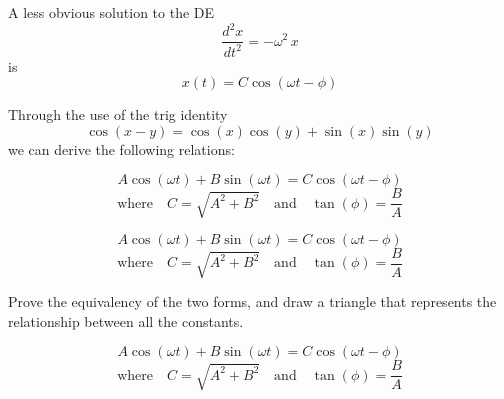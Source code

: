 \documentclass[12pt]{amsart}
\begin{document}
\newpage
A less obvious solution to the DE
$$\frac{d^2x}{dt^2}= - \omega^2\, x $$
is 
$$x(t)= C\cos(\omega t - \phi)$$

Through the use of the trig identity 
$$\cos(x-y) = \cos(x)\cos(y) + \sin(x)\sin(y)$$ 
we can derive the following relations:

\begin{boxnote}
$$A \cos(\omega t) + B \sin(\omega t) = C \cos(\omega t - \phi) $$
$$\text{where} \quad C = \sqrt{A^2 + B^2} \quad \text{and} \quad \tan(\phi) = \frac{B}{A}$$
\end{boxnote}

\newpage
$$A \cos(\omega t) + B \sin(\omega t) = C \cos(\omega t - \phi) $$
$$\text{where} \quad C = \sqrt{A^2 + B^2} \quad \text{and} \quad \tan(\phi) = \frac{B}{A}$$

\begin{problem}
 Prove the equivalency of the two forms, and draw a
  triangle that represents the relationship between all the
  constants.
\end{problem}

\newpage
\hfill
\begin{minipage}{0.7\linewidth}
$$A \cos(\omega t) + B \sin(\omega t) = C \cos(\omega t - \phi) $$
$$\text{where} \quad C = \sqrt{A^2 + B^2} \quad \text{and} \quad \tan(\phi) = \frac{B}{A}$$
\end{minipage}





\end{document}
